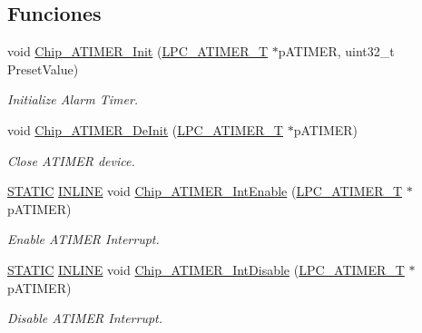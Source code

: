 \subsection*{Funciones}
\begin{DoxyCompactItemize}
\item 
void \hyperlink{group___a_t_i_m_e_r__18_x_x__43_x_x_ga0d20b10ad91803e126b2a85c4881a95c}{Chip\+\_\+\+A\+T\+I\+M\+E\+R\+\_\+\+Init} (\hyperlink{struct_l_p_c___a_t_i_m_e_r___t}{L\+P\+C\+\_\+\+A\+T\+I\+M\+E\+R\+\_\+T} $\ast$p\+A\+T\+I\+M\+ER, uint32\+\_\+t Preset\+Value)
\begin{DoxyCompactList}\small\item\em Initialize Alarm Timer. \end{DoxyCompactList}\item 
void \hyperlink{group___a_t_i_m_e_r__18_x_x__43_x_x_ga638a1690aa7cbbfb64bd05961555fc74}{Chip\+\_\+\+A\+T\+I\+M\+E\+R\+\_\+\+De\+Init} (\hyperlink{struct_l_p_c___a_t_i_m_e_r___t}{L\+P\+C\+\_\+\+A\+T\+I\+M\+E\+R\+\_\+T} $\ast$p\+A\+T\+I\+M\+ER)
\begin{DoxyCompactList}\small\item\em Close A\+T\+I\+M\+ER device. \end{DoxyCompactList}\item 
\hyperlink{group___l_p_c___types___public___macros_ga10b2d890d871e1489bb02b7e70d9bdfb}{S\+T\+A\+T\+IC} \hyperlink{spifi__18xx__43xx_8h_a2eb6f9e0395b47b8d5e3eeae4fe0c116}{I\+N\+L\+I\+NE} void \hyperlink{group___a_t_i_m_e_r__18_x_x__43_x_x_ga8bf9123a5620d2dd178fa60b9a93aaa0}{Chip\+\_\+\+A\+T\+I\+M\+E\+R\+\_\+\+Int\+Enable} (\hyperlink{struct_l_p_c___a_t_i_m_e_r___t}{L\+P\+C\+\_\+\+A\+T\+I\+M\+E\+R\+\_\+T} $\ast$p\+A\+T\+I\+M\+ER)
\begin{DoxyCompactList}\small\item\em Enable A\+T\+I\+M\+ER Interrupt. \end{DoxyCompactList}\item 
\hyperlink{group___l_p_c___types___public___macros_ga10b2d890d871e1489bb02b7e70d9bdfb}{S\+T\+A\+T\+IC} \hyperlink{spifi__18xx__43xx_8h_a2eb6f9e0395b47b8d5e3eeae4fe0c116}{I\+N\+L\+I\+NE} void \hyperlink{group___a_t_i_m_e_r__18_x_x__43_x_x_gac6a9084b0b4e2a1a1995aaf5d22ca7d2}{Chip\+\_\+\+A\+T\+I\+M\+E\+R\+\_\+\+Int\+Disable} (\hyperlink{struct_l_p_c___a_t_i_m_e_r___t}{L\+P\+C\+\_\+\+A\+T\+I\+M\+E\+R\+\_\+T} $\ast$p\+A\+T\+I\+M\+ER)
\begin{DoxyCompactList}\small\item\em Disable A\+T\+I\+M\+ER Interrupt. \end{DoxyCompactList}\item 

\end{DoxyCompactItemize}
